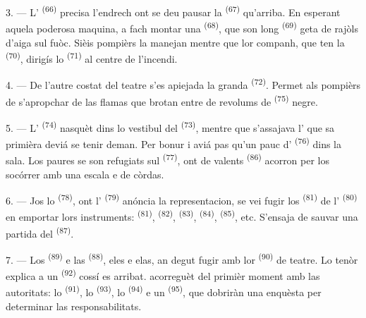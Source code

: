 3. --- L' \textsuperscript{(66)} precisa l'endrech ont se deu
pausar la  \textsuperscript{(67)} qu'arriba. En esperant
aquela poderosa maquina, a fach montar una 
\textsuperscript{(68)}, que son long 
\textsuperscript{(69)} geta de rajòls d'aiga sul fuòc. Sièis pompièrs la manejan
mentre que lor companh, que ten la  \textsuperscript{(70)},
dirigís lo  \textsuperscript{(71)} al centre de l'incendi.

4. --- De l'autre costat del teatre s'es apiejada la granda 
\textsuperscript{(72)}. Permet als pompièrs de s'apropchar de las flamas que
brotan entre de revolums de  \textsuperscript{(75)} negre.

\VUsaut{5.0mm}
\VUsaut{3.4mm}

5. --- L' \textsuperscript{(74)} nasquèt dins lo vestibul del
 \textsuperscript{(73)}, mentre que s'assajava l' que
sa primièra  deviá se tenir deman. Per bonur i aviá pas
qu'un pauc d' \textsuperscript{(76)} dins la sala. Los paures
se son refugiats sul  \textsuperscript{(77)}, ont de valents
 \textsuperscript{(86)} acorron per los socórrer amb una escala e
de còrdas.

6. --- Jos lo  \textsuperscript{(78)}, ont l'
\textsuperscript{(79)} anóncia la representacion, se vei fugir los
 \textsuperscript{(81)} de l'
\textsuperscript{(80)} en emportar lors instruments: 
\textsuperscript{(81)},  \textsuperscript{(82)},
 \textsuperscript{(83)}, 
\textsuperscript{(84)},  \textsuperscript{(85)}, etc. S'ensaja de
sauvar una partida del  \textsuperscript{(87)}.

7. --- Los  \textsuperscript{(89)} e las 
\textsuperscript{(88)},  eles e elas, an degut fugir amb lor
 \textsuperscript{(90)} de teatre. Lo tenòr explica a un
 \textsuperscript{(92)} cossí es arribat. 
acorreguèt del primièr moment amb las autoritats: lo 
\textsuperscript{(91)}, lo  \textsuperscript{(93)}, lo
 \textsuperscript{(94)} e un 
\textsuperscript{(95)}, que dobriràn una enquèsta per determinar las
responsabilitats.
\VUsaut{6.0mm}
\VUfilet{22mm}
